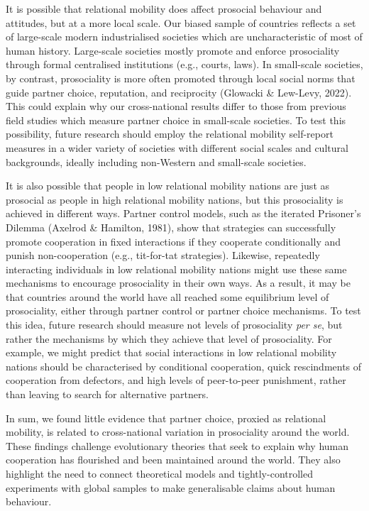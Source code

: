 \documentclass[
  man,floatsintext]{apa6}
\begin{document}
It is possible that relational mobility does affect prosocial behaviour and attitudes, but at a more local scale. Our biased sample of countries reflects a set of large-scale modern industrialised societies which are uncharacteristic of most of human history. Large-scale societies mostly promote and enforce prosociality through formal centralised institutions (e.g., courts, laws). In small-scale societies, by contrast, prosociality is more often promoted through local social norms that guide partner choice, reputation, and reciprocity (Glowacki \& Lew-Levy, 2022). This could explain why our cross-national results differ to those from previous field studies which measure partner choice in small-scale societies. To test this possibility, future research should employ the relational mobility self-report measures in a wider variety of societies with different social scales and cultural backgrounds, ideally including non-Western and small-scale societies.

It is also possible that people in low relational mobility nations are just as prosocial as people in high relational mobility nations, but this prosociality is achieved in different ways. Partner control models, such as the iterated Prisoner's Dilemma (Axelrod \& Hamilton, 1981), show that strategies can successfully promote cooperation in fixed interactions if they cooperate conditionally and punish non-cooperation (e.g., tit-for-tat strategies). Likewise, repeatedly interacting individuals in low relational mobility nations might use these same mechanisms to encourage prosociality in their own ways. As a result, it may be that countries around the world have all reached some equilibrium level of prosociality, either through partner control or partner choice mechanisms. To test this idea, future research should measure not levels of prosociality \emph{per se}, but rather the mechanisms by which they achieve that level of prosociality. For example, we might predict that social interactions in low relational mobility nations should be characterised by conditional cooperation, quick rescindments of cooperation from defectors, and high levels of peer-to-peer punishment, rather than leaving to search for alternative partners.

In sum, we found little evidence that partner choice, proxied as relational mobility, is related to cross-national variation in prosociality around the world. These findings challenge evolutionary theories that seek to explain why human cooperation has flourished and been maintained around the world. They also highlight the need to connect theoretical models and tightly-controlled experiments with global samples to make generalisable claims about human behaviour.
\end{document}
